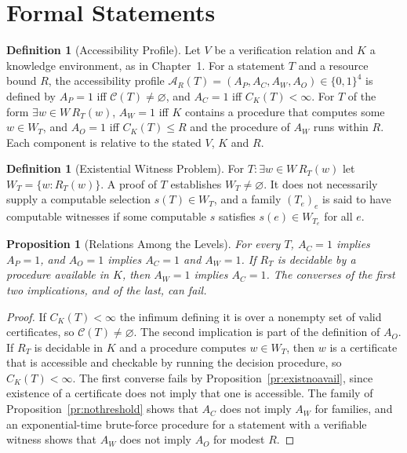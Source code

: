 \documentclass[11pt,letterpaper]{report}
\theoremstyle{plain}
\newtheorem{proposition}[theorem]{Proposition}
\theoremstyle{definition}
\newtheorem{definition}[theorem]{Definition}
\theoremstyle{remark}
\begin{document}
\section{Formal Statements}

\begin{definition}[Accessibility Profile]\label{def:profile}
Let $V$ be a verification relation and $K$ a knowledge environment, as in Chapter~1. For a statement $T$ and a resource bound $R$, the accessibility profile $\mathcal A_R(T)=(A_P,A_C,A_W,A_O)\in\{0,1\}^4$ is defined by $A_P=1$ iff $\mathcal C(T)\ne\varnothing$, and $A_C=1$ iff $C_K(T)<\infty$. For $T$ of the form $\exists w\in W\,R_T(w)$, $A_W=1$ iff $K$ contains a procedure that computes some $w\in W_T$, and $A_O=1$ iff $C_K(T)\le R$ and the procedure of $A_W$ runs within $R$. Each component is relative to the stated $V$, $K$ and $R$.
\end{definition}

\begin{definition}[Existential Witness Problem]
For $T:\exists w\in W\,R_T(w)$ let $W_T=\{w:R_T(w)\}$. A proof of $T$ establishes $W_T\ne\varnothing$. It does not necessarily supply a computable selection $s(T)\in W_T$, and a family $(T_e)_e$ is said to have computable witnesses if some computable $s$ satisfies $s(e)\in W_{T_e}$ for all $e$.
\end{definition}

\begin{proposition}[Relations Among the Levels]\label{pr:levels}
For every $T$, $A_C=1$ implies $A_P=1$, and $A_O=1$ implies $A_C=1$ and $A_W=1$. If $R_T$ is decidable by a procedure available in $K$, then $A_W=1$ implies $A_C=1$. The converses of the first two implications, and of the last, can fail.
\end{proposition}
\begin{proof}
If $C_K(T)<\infty$ the infimum defining it is over a nonempty set of valid certificates, so $\mathcal C(T)\ne\varnothing$. The second implication is part of the definition of $A_O$. If $R_T$ is decidable in $K$ and a procedure computes $w\in W_T$, then $w$ is a certificate that is accessible and checkable by running the decision procedure, so $C_K(T)<\infty$. The first converse fails by Proposition~\ref{pr:existnoavail}, since existence of a certificate does not imply that one is accessible. The family of Proposition~\ref{pr:nothreshold} shows that $A_C$ does not imply $A_W$ for families, and an exponential-time brute-force procedure for a statement with a verifiable witness shows that $A_W$ does not imply $A_O$ for modest $R$.
\end{proof}
\end{document}

